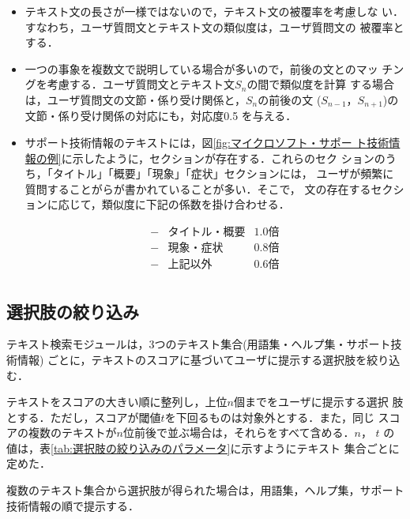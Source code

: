 \begin{itemize}
 \item テキスト文の長さが一様ではないので，テキスト文の被覆率を考慮しな
       い．すなわち，ユーザ質問文とテキスト文の類似度は，ユーザ質問文の
       被覆率とする．
 \item 一つの事象を複数文で説明している場合が多いので，前後の文とのマッ
       チングを考慮する．ユーザ質問文とテキスト文$S_n$の間で類似度を計算
       する場合は，ユーザ質問文の文節・係り受け関係と，$S_n$の前後の文
       ($S_{n-1}$，$S_{n+1}$)の文節・係り受け関係の対応にも，対応度0.5
       を与える．
 \item サポート技術情報のテキストには，図\ref{fig:マイクロソフト・サポー
       ト技術情報の例}に示したように，セクションが存在する．これらのセク
       ションのうち，「タイトル」「概要」「現象」「症状」セクションには，
       ユーザが頻繁に質問することがらが書かれていることが多い．そこで，
       文の存在するセクションに応じて，類似度に下記の係数を掛け合わせる．

       \[
	\begin{array}{llc}
	 - & タイトル・概要 & 1.0倍 \\
	 - & 現象・症状     & 0.8倍 \\
	 - & 上記以外       & 0.6倍 \\
	\end{array}
       \]


\end{itemize}


\subsection{選択肢の絞り込み}

テキスト検索モジュールは，3つのテキスト集合(用語集・ヘルプ集・サポート技
術情報) ごとに，テキストのスコアに基づいてユーザに提示する選択肢を絞り込
む．

テキストをスコアの大きい順に整列し，上位$n$個までをユーザに提示する選択
肢とする．ただし，スコアが閾値$t$を下回るものは対象外とする．また，同じ
スコアの複数のテキストが$n$位前後で並ぶ場合は，それらをすべて含める．$n$，
$t$ の値は，表\ref{tab:選択肢の絞り込みのパラメータ}に示すようにテキスト
集合ごとに定めた．

複数のテキスト集合から選択肢が得られた場合は，用語集，ヘルプ集，サポート
技術情報の順で提示する．

